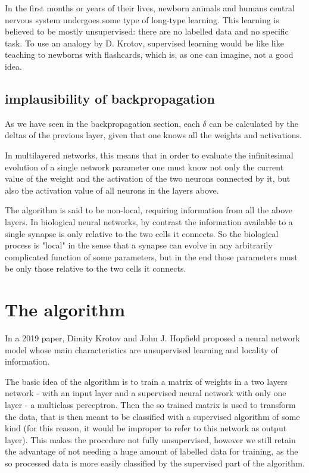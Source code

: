 \documentclass[a4paper]{report}
\begin{document}
In the first months or years of their lives, newborn animals and humans central nervous system undergoes some type of long-type learning.
This learning is believed to be mostly unsupervised:
there are no labelled data and no specific task.
To use an analogy by D. Krotov, supervised learning would be like like teaching to newborns with flashcards, which is, as one can imagine, not a good idea.

\subsection{implausibility of backpropagation}
As we have seen in the backpropagation section, each $\delta$ can be calculated by the deltas of the previous layer, given that one knows all the weights and activations.


In multilayered networks, this means that in order to evaluate the infinitesimal evolution of a single network parameter one must know not only the current value of the weight and the activation of the two neurons connected by it, but also the activation value of all neurons in the layers above.

The algorithm is said to be non-local, requiring information from all the above layers.
In biological neural networks, by contrast the information available to a single synapse is only relative to the two cells it connects.
So the biological process is "local" in the sense that a synapse can evolve in any arbitrarily complicated function of some parameters, but in the end those parameters must be only those relative to the two cells it connects.

\section{The algorithm}
In a 2019 paper, Dimity Krotov and John J. Hopfield proposed a neural network model whose main characteristics are unsupervised learning and locality of information.

The basic idea of the algorithm is to train a matrix of weights in a two layers network - with an input layer and a supervised neural network with only one layer - a multiclass perceptron.
Then the so trained matrix is used to transform the data, that is then meant to be classified with a supervised algorithm of some kind (for this reason, it would be improper to refer to this network as output layer).
This makes the procedure not fully unsupervised, however we still retain the advantage of not needing a huge amount of labelled data for training, as the so processed data is more easily classified by the supervised part of the algorithm.
\end{document}

